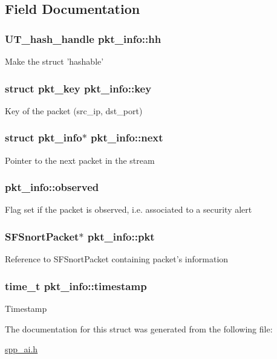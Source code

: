 \subsection{Field Documentation}
\hypertarget{structpkt__info_a264e90d4b5d490de040f38c1072e142f}{
\subsubsection[{hh}]{\setlength{\rightskip}{0pt plus 5cm}UT\_\-hash\_\-handle {\bf pkt\_\-info::hh}}}
\label{structpkt__info_a264e90d4b5d490de040f38c1072e142f}
Make the struct 'hashable' \hypertarget{structpkt__info_a231d4734d3c62292b06eb9ea4b49c339}{
\subsubsection[{key}]{\setlength{\rightskip}{0pt plus 5cm}struct {\bf pkt\_\-key} {\bf pkt\_\-info::key}}}
\label{structpkt__info_a231d4734d3c62292b06eb9ea4b49c339}
Key of the packet (src\_\-ip, dst\_\-port) \hypertarget{structpkt__info_a5ee3c51f2ca5768b94819182641ef168}{
\subsubsection[{next}]{\setlength{\rightskip}{0pt plus 5cm}struct {\bf pkt\_\-info}$\ast$ {\bf pkt\_\-info::next}}}
\label{structpkt__info_a5ee3c51f2ca5768b94819182641ef168}
Pointer to the next packet in the stream \hypertarget{structpkt__info_ac7ff78ea5faf333fc91f92e3085ea7c9}{
\subsubsection[{observed}]{ {\bf pkt\_\-info::observed}}}
\label{structpkt__info_ac7ff78ea5faf333fc91f92e3085ea7c9}
Flag set if the packet is observed, i.e. associated to a security alert \hypertarget{structpkt__info_a8d5ebd04a32067b05387e5c5056fe168}{
\subsubsection[{pkt}]{\setlength{\rightskip}{0pt plus 5cm}SFSnortPacket$\ast$ {\bf pkt\_\-info::pkt}}}
\label{structpkt__info_a8d5ebd04a32067b05387e5c5056fe168}
Reference to SFSnortPacket containing packet's information \hypertarget{structpkt__info_a7f5090443f21e6290f0439f1bb872e92}{
\subsubsection[{timestamp}]{\setlength{\rightskip}{0pt plus 5cm}time\_\-t {\bf pkt\_\-info::timestamp}}}
\label{structpkt__info_a7f5090443f21e6290f0439f1bb872e92}
Timestamp 

The documentation for this struct was generated from the following file:\begin{DoxyCompactItemize}
\item 
\hyperlink{spp__ai_8h}{spp\_\-ai.h}\end{DoxyCompactItemize}
